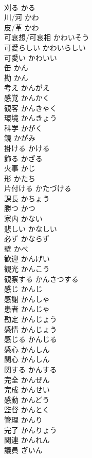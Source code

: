 \documentclass[8pt]{extreport}
\begin{document}
\begin{CJK}{UTF8}{min}
\\	刈る	かる	
\\	川/河	かわ	
\\	皮/革	かわ	
\\	可哀想/可哀相	かわいそう	
\\	可愛らしい	かわいらしい	
\\	可愛い	かわいい	
\\	缶	かん	
\\	勘	かん	
\\	考え	かんがえ	
\\	感覚	かんかく	
\\	観客	かんきゃく	
\\	環境	かんきょう	
\\	科学	かがく	
\\	鏡	かがみ	
\\	掛ける	かける	
\\	飾る	かざる	
\\	火事	かじ	
\\	形	かたち	
\\	片付ける	かたづける	
\\	課長	かちょう	
\\	勝つ	かつ	
\\	家内	かない	
\\	悲しい	かなしい	
\\	必ず	かならず	
\\	壁	かべ	
\\	歓迎	かんげい	
\\	観光	かんこう	
\\	観察する	かんさつする	
\\	感じ	かんじ	
\\	感謝	かんしゃ	
\\	患者	かんじゃ	
\\	勘定	かんじょう	
\\	感情	かんじょう	
\\	感じる	かんじる	
\\	感心	かんしん	
\\	関心	かんしん	
\\	関する	かんする	
\\	完全	かんぜん	
\\	完成	かんせい	
\\	感動	かんどう	
\\	監督	かんとく	
\\	管理	かんり	
\\	完了	かんりょう	
\\	関連	かんれん	
\\	議員	ぎいん	

\end{CJK}
\end{document}
